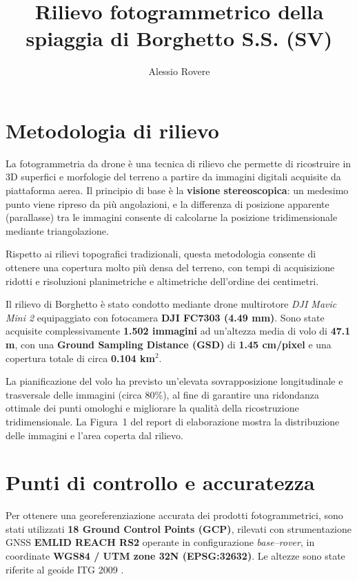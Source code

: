 \documentclass[9pt,a4paper,twocolumn,twoside]{tau-class/tau}
\title{Rilievo fotogrammetrico della spiaggia di Borghetto S.S. (SV)}
\author[a]{Alessio Rovere}
\begin{document}
		
    \maketitle 
    \thispagestyle{firststyle} 
    \tauabstract 
    

\section*{Metodologia di rilievo}

La fotogrammetria da drone è una tecnica di rilievo che permette di ricostruire in 3D superfici e morfologie del terreno a partire da immagini digitali acquisite da piattaforma aerea. 
Il principio di base è la \textbf{visione stereoscopica}: un medesimo punto viene ripreso da più angolazioni, e la differenza di posizione apparente (parallasse) tra le immagini consente di calcolarne la posizione tridimensionale mediante triangolazione. 

Rispetto ai rilievi topografici tradizionali, questa metodologia consente di ottenere una copertura molto più densa del terreno, con tempi di acquisizione ridotti e risoluzioni planimetriche e altimetriche dell’ordine dei centimetri. 

Il rilievo di Borghetto è stato condotto mediante drone multirotore \textit{DJI Mavic Mini 2} equipaggiato con fotocamera \textbf{DJI FC7303 (4.49 mm)}.  
Sono state acquisite complessivamente \textbf{1.502 immagini} ad un’altezza media di volo di \textbf{47.1 m}, con una \textbf{Ground Sampling Distance (GSD)} di \textbf{1.45 cm/pixel} e una copertura totale di circa \textbf{0.104 km$^2$}.  

La pianificazione del volo ha previsto un’elevata sovrapposizione longitudinale e trasversale delle immagini (circa 80\%), al fine di garantire una ridondanza ottimale dei punti omologhi e migliorare la qualità della ricostruzione tridimensionale.  
La Figura~1 del report di elaborazione mostra la distribuzione delle immagini e l’area coperta dal rilievo.


\section*{Punti di controllo e accuratezza}

Per ottenere una georeferenziazione accurata dei prodotti fotogrammetrici, sono stati utilizzati \textbf{18 Ground Control Points (GCP)}, rilevati con strumentazione GNSS \textbf{EMLID REACH RS2} operante in configurazione \textit{base–rover}, in coordinate \textbf{WGS84 / UTM zone 32N (EPSG:32632)}. Le altezze sono state riferite al geoide ITG 2009 \cite{corchete2010high}.
\end{document}
